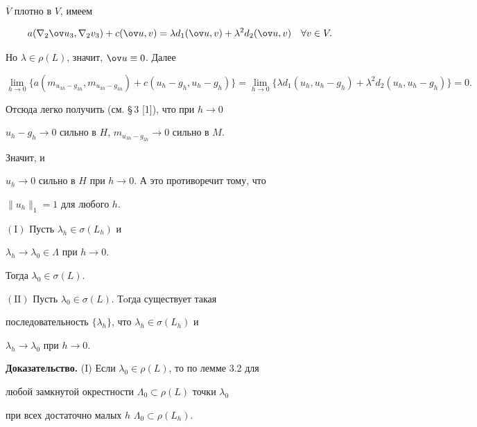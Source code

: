 $\overline V$ плотно в $V$, имеем


$$


a(\nabla_2{\ov u_3},\nabla_2{v_3})+c(\ov u,v)=


\lambda d_1(\ov u,v)+{\lambda}^2{d}_2(\ov u,v)\quad \forall v \in V.


$$


Но $\lambda \in \rho(L)$, значит, $\ov u \equiv 0$. Далее


$$


\lim_{h\to 0}\{a(m_{u_{3h}-g_{3h}},m_{u_{3h}-g_{3h}})+c(u_h-g_h,u_h-g_h)\}=


\lim_{h\to 0}\{\lambda d_1(u_h,u_h-g_h)+{\lambda}^2 d_2(u_h,u_h-g_h)\}=0.


$$


Отсюда легко получить (см. \S\,3 [1]), что при $h\to 0$\;


$u_h-g_h\to 0$ сильно в $H$, $m_{u_{3h}-g_{3h}} \to 0$ сильно в $M$.


Значит, и


$u_h\to 0$ сильно в $H$ при $h\to 0$. А это противоречит тому, что


$\|u_h\|_1=1$ для любого $h$.





\begin{thms} $\mathrm{(I)}$ Пусть $\lambda_h \in \sigma(L_h)$ и


$\lambda_h \to \lambda_0\in \Lambda$ при $h \to 0$.


Тогда $\lambda_0 \in \sigma(L)$.





$\mathrm{(II)}$ Пусть $\lambda_0 \in \sigma(L)$. Тoгда существует такая


последовательность $\{\lambda_h\}$, что $\lambda_h\in \sigma(L_h)$ и


$\lambda_h \to \lambda_0$ при $h \to 0$.


\end{thms}





{\bf Доказательство.} (I) Если $\lambda_0 \in \rho(L)$, то по лемме 3.2 для


любой замкнутой окрестности $\Lambda_0 \subset \rho(L)$ точки $\lambda_0$


при всех достаточно малых $h$\; $\Lambda_0 \subset \rho(L_h)$.


\medskip





